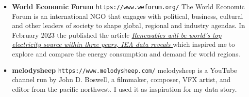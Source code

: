 \documentclass{article}
\begin{document}
\begin{itemize}
    \item \textbf{World Economic Forum} \newline
    \texttt{https://www.weforum.org/} \newline
    The World Economic Forum is an international NGO that engages with political, business, cultural and other leaders of society to shape global, regional and industry agendas.
    In February 2023 the published the article \textit{\href{https://www.weforum.org/agenda/2023/02/renewables-world-top-electricity-source-data/}{Renewables will be world's top electricity source within three years, IEA data reveals
    }} which inspired me to explore and compare the energy consumption and demand for world regions.
    
    \newpage
    \item \textbf{melodysheep} \newline
    \texttt{https://www.melodysheep.com/} \newline
    melodysheep is a YouTube channel run by John D. Boswell, a filmmaker, composer, VFX artist, and editor from the pacific northwest.
    I used it as inspiration for my data story.
\end{itemize}
\end{document}
